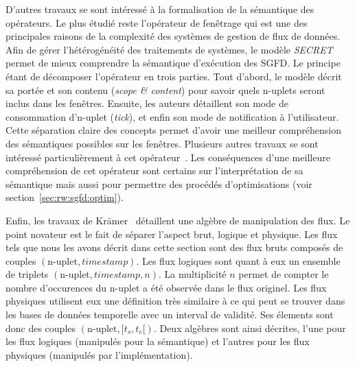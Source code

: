 D'autres travaux se sont intéressé à la formalisation de la sémantique des opérateurs. Le plus étudié reste l'opérateur de fenêtrage qui est une des principales raisons de la complexité des systèmes de gestion de flux de données. Afin de gérer l'hétérogénéité des traitements de systèmes, le modèle \textit{SECRET} permet de mieux comprendre la sémantique d'exécution des SGFD. Le principe étant de décomposer l'opérateur en trois parties. Tout d'abord, le modèle décrit sa portée et son contenu (\textit{scope \& content}) pour savoir quels n-uplets seront inclus dans les fenêtres. Ensuite, les auteurs détaillent son mode de consommation d'n-uplet (\textit{tick}), et enfin son mode de notification à l'utilisateur. Cette séparation claire des concepts permet d'avoir une meilleur compréhension des sémantiques possibles sur les fenêtres. Plusieurs autres travaux se sont intéressé particulièrement à cet opérateur~\cite{Patroumpas:window,Patroumpas:subsumewindows,Maier:semantics}. Les conséquences d'une meilleure compréhension de cet opérateur sont certains sur l'interprétation de sa sémantique mais aussi pour permettre des procédés d'optimisations (voir section~\ref{sec:rw:sgfd:optim}).

Enfin, les travaux de Krämer~\cite{Kramer:semantics} détaillent une algèbre de manipulation des flux. Le point novateur est le fait de séparer l'aspect brut, logique et physique. Les flux tels que nous les avons décrit dans cette section sont des flux bruts composés de couples $(\textrm{n-uplet},\textit{timestamp})$. Les flux logiques sont quant à eux un ensemble de triplets $(\textrm{n-uplet}, \textit{timestamp}, n)$. La multiplicité $n$ permet de compter le nombre d'occurences du n-uplet a été observée dans le flux originel. Les flux physiques utilisent eux une définition très similaire à ce qui peut se trouver dans les bases de données temporelle avec un interval de validité. Ses élements sont donc des couples $(\textrm{n-uplet},[t_s, t_e[)$. Deux algèbres sont ainsi décrites, l'une pour les flux logiques (manipulés pour la sémantique) et l'autres pour les flux physiques (manipulés par l'implémentation).